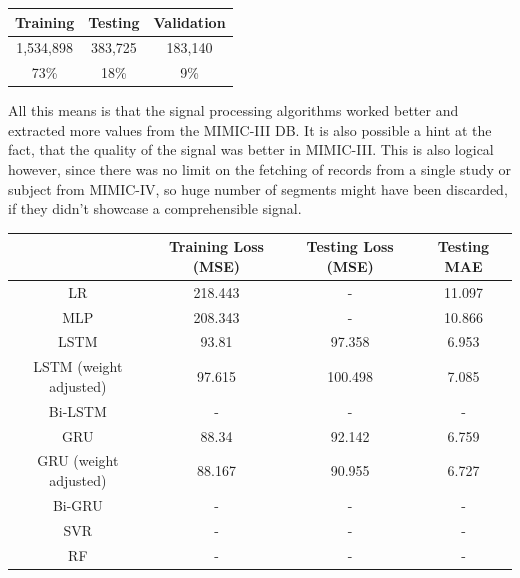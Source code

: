 \begin{center}
    \begin{tabular}{|c|c|c|}
        \hline
        Training  & Testing & Validation \\
        \hline
        1,534,898 & 383,725 & 183,140    \\
        \hline
        73\%      & 18\%    & 9\%        \\
        \hline
    \end{tabular}
\end{center}

All this means is that the signal processing algorithms worked better and extracted more values from the MIMIC-III DB.
It is also possible a hint at the fact, that the quality of the signal was better in MIMIC-III.
This is also logical however, since there was no limit on the fetching of records from a single study or subject from MIMIC-IV,
so huge number of segments might have been discarded, if they didn't showcase a comprehensible signal.

\begin{center}
    \begin{tabular}{ |c|c|c|c| }
        \hline
        & Training Loss (MSE) & Testing Loss (MSE) & Testing MAE \\
        \hline
        LR                     & 218.443             & -                  & 11.097      \\
        \hline
        MLP                    & 208.343             & -                  & 10.866      \\
        \hline
        LSTM                   & 93.81               & 97.358             & 6.953       \\
        \hline
        LSTM (weight adjusted) & 97.615              & 100.498            & 7.085       \\
        \hline
        Bi-LSTM                & -                   & -                  & -           \\
        \hline
        GRU                    & 88.34               & 92.142             & 6.759       \\
        \hline
        GRU (weight adjusted)  & 88.167              & 90.955             & 6.727       \\
        \hline
        Bi-GRU                 & -                   & -                  & -           \\
        \hline
        SVR                    & -                   & -                  & -           \\
        \hline
        RF                     & -                   & -                  & -           \\
        \hline
    \end{tabular}
\end{center}

